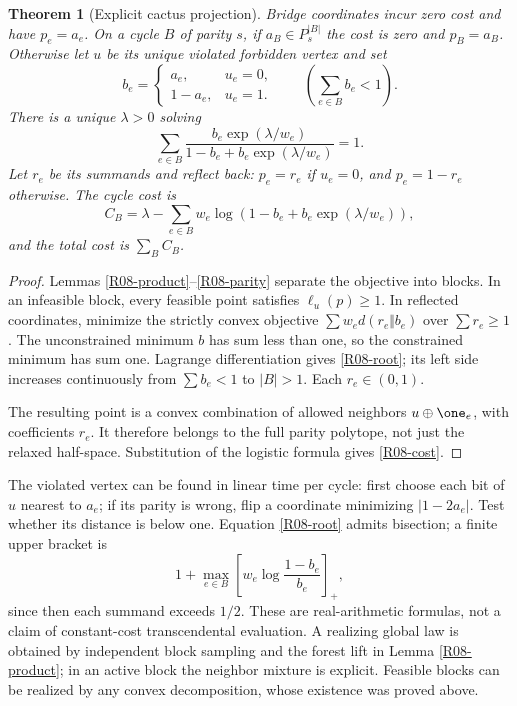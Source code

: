 \documentclass[11pt,a4paper]{article}
\newtheorem{theorem}{Theorem}[section]
\theoremstyle{definition}\newtheorem{definition}[theorem]{Definition}
\theoremstyle{remark}\newtheorem{remark}[theorem]{Remark}
\numberwithin{equation}{section}
\begin{document}
\begin{theorem}[Explicit cactus projection]\label{R08-cactus}
Bridge coordinates incur zero cost and have $p_e=a_e$. On a cycle $B$ of parity $s$, if $a_B\in P_s^{|B|}$ the cost is zero and $p_B=a_B$. Otherwise let $u$ be its unique violated forbidden vertex and set
\[
 b_e=\begin{cases}a_e,&u_e=0,\\1-a_e,&u_e=1.\end{cases}
 \qquad\left(\sum_{e\in B}b_e<1\right).
\]
There is a unique $\lambda>0$ solving
\begin{equation}\label{R08-root}
 \sum_{e\in B}\frac{b_e\exp(\lambda/w_e)}{1-b_e+b_e\exp(\lambda/w_e)}=1.
\end{equation}
Let $r_e$ be its summands and reflect back: $p_e=r_e$ if $u_e=0$, and $p_e=1-r_e$ otherwise. The cycle cost is
\begin{equation}\label{R08-cost}
 C_B=\lambda-\sum_{e\in B}w_e\log(1-b_e+b_e\exp(\lambda/w_e)),
\end{equation}
and the total cost is $\sum_B C_B$.
\end{theorem}
\begin{proof}
Lemmas \ref{R08-product}--\ref{R08-parity} separate the objective into blocks. In an infeasible block, every feasible point satisfies $\ell_u(p)\ge1$. In reflected coordinates, minimize the strictly convex objective $\sum w_e d(r_e\Vert b_e)$ over $\sum r_e\ge1$. The unconstrained minimum $b$ has sum less than one, so the constrained minimum has sum one. Lagrange differentiation gives \eqref{R08-root}; its left side increases continuously from $\sum b_e<1$ to $|B|>1$. Each $r_e\in(0,1)$.

The resulting point is a convex combination of allowed neighbors $u\oplus\one_e$, with coefficients $r_e$. It therefore belongs to the full parity polytope, not just the relaxed half-space. Substitution of the logistic formula gives \eqref{R08-cost}.
\end{proof}

The violated vertex can be found in linear time per cycle: first choose each bit of $u$ nearest to $a_e$; if its parity is wrong, flip a coordinate minimizing $|1-2a_e|$. Test whether its distance is below one. Equation \eqref{R08-root} admits bisection; a finite upper bracket is
\[
 1+\max_{e\in B}\left[w_e\log\frac{1-b_e}{b_e}\right]_+,
\]
since then each summand exceeds $1/2$. These are real-arithmetic formulas, not a claim of constant-cost transcendental evaluation. A realizing global law is obtained by independent block sampling and the forest lift in Lemma \ref{R08-product}; in an active block the neighbor mixture is explicit. Feasible blocks can be realized by any convex decomposition, whose existence was proved above.
\end{document}
